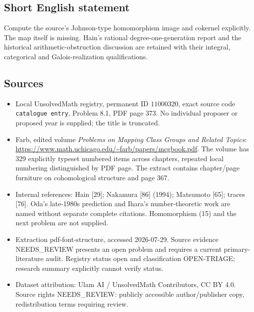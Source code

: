 \documentclass[11pt]{article}
\begin{document}
\subsection{Short English statement}
Compute the source's Johnson-type homomorphism image and cokernel explicitly. The map itself is missing. Hain's rational degree-one-generation report and the historical arithmetic-obstruction discussion are retained with their integral, categorical and Galois-realization qualifications.
\subsection{Sources}
\begin{itemize}
\item Local UnsolvedMath registry, permanent ID \(11000320\), exact source code \texttt{catalogue entry}, Problem 8.1, PDF page 373. No individual proposer or proposed year is supplied; the title is truncated.
\item Farb, edited volume \emph{Problems on Mapping Class Groups and Related Topics}: \url{https://www.math.uchicago.edu/~farb/papers/mcgbook.pdf}. The volume has 329 explicitly typeset numbered items across chapters, repeated local numbering distinguished by PDF page. The extract contains chapter/page furniture on cohomological structure and page 367.
\item Internal references: Hain [29]; Nakamura [86] (1994); Matsumoto [65]; traces [76]. Oda's late-1980s prediction and Ihara's number-theoretic work are named without separate complete citations. Homomorphism (15) and the next problem are not supplied.
\item Extraction pdf-font-structure, accessed 2026-07-29. Source evidence NEEDS\_REVIEW presents an open problem and requires a current primary-literature audit. Registry status open and classification OPEN-TRIAGE; research summary explicitly cannot verify status.
\item Dataset attribution: Ulam AI / UnsolvedMath Contributors, CC BY 4.0. Source rights NEEDS\_REVIEW: publicly accessible author/publisher copy, redistribution terms requiring review.
\end{itemize}
\end{document}
